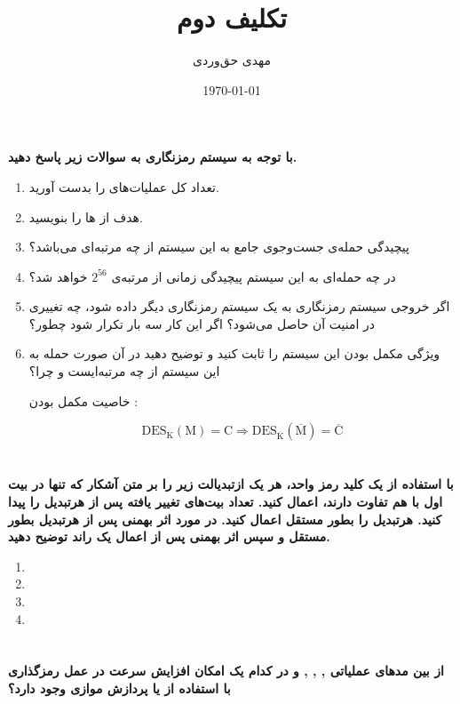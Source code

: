 \documentclass{article}
\title{تکلیف دوم}
\author{مهدی حق‌وردی}
\date{\today}
\begin{document}
\maketitle

\section{}
\textbf{{\large با توجه به سیستم رمزنگاری  به سوالات زیر پاسخ دهید.}}

\begin{enumerate}[label=\alph*)]
\item 
تعداد کل عملیات‌های 
را بدست آورید.

\item 
هدف از 
ها
را بنویسید.

\item 
پیچیدگی حمله‌ی جست‌وجوی جامع به این سیستم از چه مرتبه‌ای می‌باشد؟

\item 
 در چه حمله‌ای به این سیستم پیچیدگی زمانی از مرتبه‌ی
$2^{56}$
خواهد شد؟

\item 
اگر خروجی سیستم رمزنگاری به یک سیستم رمزنگاری دیگر داده شود، چه تغییری در
امنیت آن حاصل می‌شود؟  اگر این کار سه بار تکرار شود
چطور؟ 

\item 
ویژگی مکمل بودن این سیستم را ثابت کنید و توضیح دهید در آن صورت حمله به
این سیستم از چه مرتبه‌ایست و چرا؟

خاصیت مکمل بودن 
:
\begin{latin}
\begin{equation}
\text{DES}_\text{K}(\text{M}) = \text{C}
\Rightarrow
\text{DES}_{\overline{\text{K}}}(\overline{\text{M}}) = \overline{\text{C}}
\end{equation}
\end{latin}
\end{enumerate}

\section{}
{\large \textbf{با استفاده از یک کلید رمز واحد، هر یک ازتبدیالت زیر را بر متن آشکار که تنها در بیت اول با هم تفاوت دارند، اعمال کنید. تعداد بیت‌های تغییر یافته پس از هرتبدیل را پیدا کنید. هرتبدیل را بطور مستقل اعمال کنید. در مورد اثر بهمنی پس از هرتبدیل بطور مستقل و سپس اثر بهمنی پس از اعمال یک راند توضیح دهید.}}

\begin{enumerate}[label=\alph*)]
\item {}
\item {}
\item {}
\item {}
\end{enumerate}

\section{}
{\large \textbf{از بین مدهای عملیاتی
,
,
,
و
در کدام یک امکان افزایش سرعت در عمل رمزگذاری با استفاده از
یا پردازش موازی وجود دارد؟}}
\end{document}
